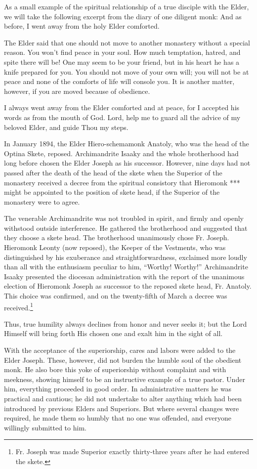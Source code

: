 \begin{longquote}{As a small example of the spiritual relationship of a true disciple with the Elder, we will take the following excerpt from the diary of one diligent monk:}
And as before, I went away from the holy Elder comforted.

The Elder said that one should not move to another monastery without a special reason. You won't find peace in your soul. How much temptation, hatred, and spite there will be! One may seem to be your friend, but in his heart he has a knife prepared for you. You should not move of your own will; you will not be at peace and none of the comforts of life will console you. It is another matter, however, if you are moved because of obedience.

I always went away from the Elder comforted and at peace, for I accepted his words as from the mouth of God. Lord, help me to guard all the advice of my beloved Elder, and guide Thou my steps.
\end{longquote}

In January 1894, the Elder Hiero-schemamonk Anatoly, who was the head of the Optina Skete, reposed. Archimandrite Isaaky and the whole brotherhood had long before chosen the Elder Joseph as his successor. However, nine days had not passed after the death of the head of the skete when the Superior of the monastery received a decree from the spiritual consistory that Hieromonk *** might be appointed to the position of skete head, if the Superior of the monastery were to agree.

The venerable Archimandrite was not troubled in spirit, and firmly and openly withstood outside interference. He gathered the brotherhood and suggested that they choose a skete head. The brotherhood unanimously chose Fr. Joseph. Hieromonk Leonty (now reposed), the Keeper of the Vestments, who was distinguished by his exuberance and straightforwardness, exclaimed more loudly than all with the enthusiasm peculiar to him, ``Worthy! Worthy!'' Archimandrite Isaaky presented the diocesan administration with the report of the unanimous election of Hieromonk Joseph as successor to the reposed skete head, Fr. Anatoly. This choice was confirmed, and on the twenty-fifth of March a decree was received.\footnote{Fr. Joseph was made Superior exactly thirty-three years after he had entered the skete.}

Thus, true humility always declines from honor and never seeks it; but the Lord Himself will bring forth His chosen one and exalt him in the sight of all.

With the acceptance of the superiorship, cares and labors were added to the Elder Joseph. These, however, did not burden the humble soul of the obedient monk. He also bore this yoke of superiorship without complaint and with meekness, showing himself to be an instructive example of a true pastor. Under him, everything proceeded in good order. In administrative matters he was practical and cautious; he did not undertake to alter anything which had been introduced by previous Elders and Superiors. But where several changes were required, he made them so humbly that no one was offended, and everyone willingly submitted to him.

